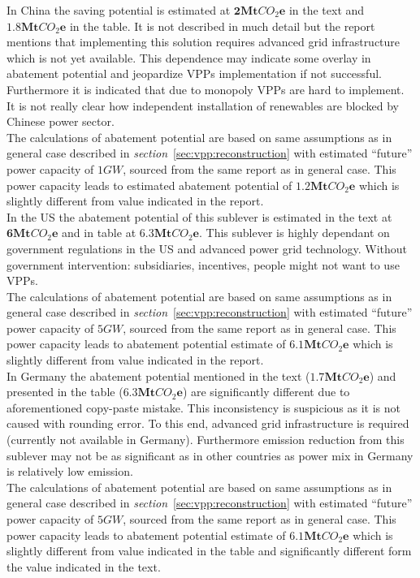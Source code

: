 \documentclass[11pt, twocolumn]{article}
\begin{document}
In China the saving potential is estimated at $\mathbf{2} \mathbf{Mt}CO_2\mathbf{e}$ in the text and $\mathbf{1.8} \mathbf{Mt}CO_2\mathbf{e}$ in the table. It is not described in much detail but the report mentions that implementing this solution requires advanced grid infrastructure which is not yet available. This dependence may indicate some overlay in abatement potential and jeopardize VPPs implementation if not successful. Furthermore it is indicated that due to monopoly VPPs are hard to implement. It is not really clear how independent installation of renewables are blocked by Chinese power sector.\\
The calculations of abatement potential are based on same assumptions as in general case described in \emph{section}~\ref{sec:vpp:reconstruction} with estimated ``future'' power capacity of $1GW$, sourced from the same report as in general case. This power capacity leads to estimated abatement potential of $\mathbf{1.2} \mathbf{Mt}CO_2\mathbf{e}$ which is slightly different from value indicated in the report.\\

In the US the abatement potential of this sublever is estimated in the text at $\mathbf{6} \mathbf{Mt}CO_2\mathbf{e}$ and in table at $\mathbf{6.3} \mathbf{Mt}CO_2\mathbf{e}$. This sublever is highly dependant on government regulations in the US and advanced power grid technology. Without government intervention: subsidiaries, incentives, people might not want to use VPPs.\\
The calculations of abatement potential are based on same assumptions as in general case described in \emph{section}~\ref{sec:vpp:reconstruction} with estimated ``future'' power capacity of $5GW$, sourced from the same report as in general case. This power capacity leads to abatement potential estimate of $\mathbf{6.1} \mathbf{Mt}CO_2\mathbf{e}$ which is slightly different from value indicated in the report.\\

In Germany the abatement potential mentioned in the text ($\mathbf{1.7} \mathbf{Mt}CO_2\mathbf{e}$) and presented in the table ($\mathbf{6.3} \mathbf{Mt}CO_2\mathbf{e}$) are significantly different due to aforementioned copy-paste mistake. This inconsistency is suspicious as it is not caused with rounding error. To this end, advanced grid infrastructure is required (currently not available in Germany). Furthermore emission reduction from this sublever may not be as significant as in other countries as power mix in Germany is relatively low emission.\\
The calculations of abatement potential are based on same assumptions as in general case described in \emph{section}~\ref{sec:vpp:reconstruction} with estimated ``future'' power capacity of $5GW$, sourced from the same report as in general case. This power capacity leads to abatement potential estimate of $\mathbf{6.1} \mathbf{Mt}CO_2\mathbf{e}$ which is slightly different from value indicated in the table and significantly different form the value indicated in the text.\\
\end{document}
